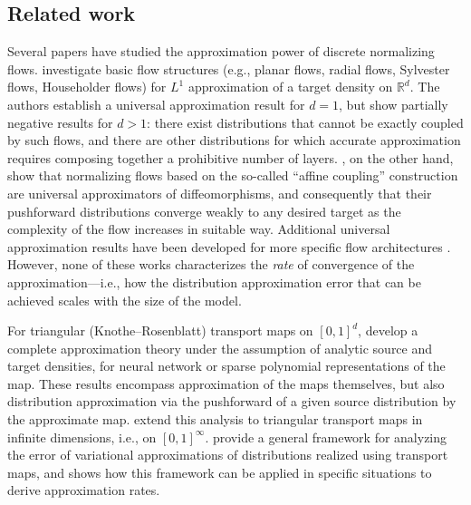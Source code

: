 \begin{itemize}



\end{itemize}


\subsection{Related work}


Several papers have studied the approximation power of discrete normalizing flows. \citet{DisAppro2} investigate basic flow structures (e.g., planar flows, radial flows, Sylvester flows, Householder flows) for $L^1$ approximation of a target density on $\mathbb{R}^d$. The authors establish a universal approximation result for $d=1$, but show partially negative results for $d>1$: there exist distributions that cannot be exactly coupled by such flows, and there are other distributions for which accurate approximation requires composing together a prohibitive number of layers. \citet{DisAppro1}, on the other hand, show that normalizing flows based on the so-called ``affine coupling'' construction are universal approximators of diffeomorphisms, and consequently that their pushforward distributions converge weakly to any desired target as the complexity of the flow increases in suitable way. Additional universal approximation results have been developed for more specific flow architectures \citep{NeuralAutoFlow}. However, none of these works characterizes the \emph{rate} of convergence of the approximation---i.e., how the distribution approximation error that can be achieved scales with the size of the model.

For triangular (Knothe--Rosenblatt) transport maps on $[0,1]^d$, \citet{ZM1} develop a complete approximation theory under the assumption of analytic source and target densities, for neural network or sparse polynomial representations of the map. These results encompass approximation of the maps themselves, but also distribution approximation via the pushforward of a given source distribution by the approximate map. \citet{ZM2} extend this analysis to triangular transport maps in infinite dimensions, i.e., on $[0,1]^\infty$. \citet{baptista2023approximation} provide a general framework for analyzing the error of variational approximations of distributions realized using transport maps, and shows how this framework can be applied in specific situations to derive approximation rates.


